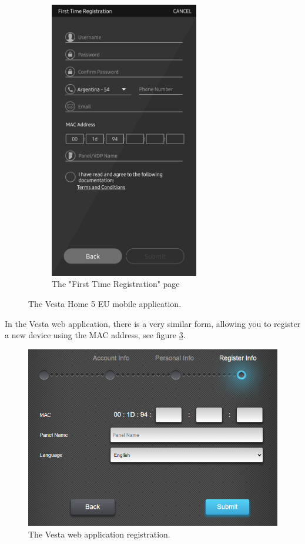 \begin{figure}[!ht]
\begin{subfigure}[t]{0.5\textwidth}
        \includegraphics[height=4.8in]{images/6-pentesting/vesta-home-registration.jpg}
        \caption{The "First Time Registration" page}
        \label{fig:vesta-registration-page}
    \end{subfigure}
    \caption{The Vesta Home 5 EU mobile application.}
    \label{fig:vesta-home-app}
\end{figure}
In the Vesta web application, there is a very similar form, allowing you to register a new device using the MAC address, see figure \ref{fig:vesta-web-registration}.
\begin{figure}[!ht]
    \centering
    \includegraphics[width=\textwidth]{images/6-pentesting/vesta-web-registration.png}
    \caption{The Vesta web application registration.}
    \label{fig:vesta-web-registration}
\end{figure}

